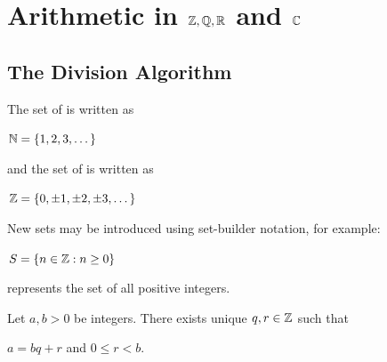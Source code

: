 \documentclass[11pt,fleqn,dvipsnames,usenames]{article}
\renewcommand{\headrulewidth}{1pt}
\newcommand{\p}{\noindent}
\begin{document}
\fancyhead[R]{\term}
\renewcommand{\headrulewidth}{0.4pt}


\tableofcontents
\newpage

\setcounter{section}{0}
\section{Arithmetic in \texorpdfstring{$\mathbb{Z}, \mathbb{Q}, \mathbb{R}$}{Z, Q, R} and \texorpdfstring{$\mathbb{C}$}{C}}
\setcounter{subsection}{0}

\subsection{The Division Algorithm}

The set of  is written as
\begin{center}
$\mathbb{N} = \left\{1,2,3,\dots\right\}$
\end{center}
and the set of  is written as
\begin{center}
\item $\mathbb{Z} = \left\{0, \pm 1, \pm 2,\pm 3,\dots\right\}$
\end{center}
\vsp

\p New sets may be introduced using set-builder notation, for example:
\begin{center}
$S = \left\{n\in\mathbb{Z}:n\geq 0\right\}$
\end{center}
represents the set of all positive integers.
\vsp

\begin{theorem} Let $a,b > 0$ be integers.  There exists unique $q,r\in\mathbb{Z}$ such that
\begin{center}
$a = bq + r$ and $0\leq r < b$.
\end{center}
\end{theorem}
\end{document}
